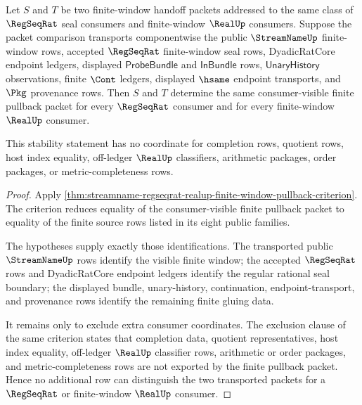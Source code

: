 \begin{theorem}
\label{thm:streamname-regseqrat-realup-pullback-stability}
Let $S$ and $T$ be two finite-window handoff packets addressed to the same
class of $\RegSeqRat$ seal consumers and finite-window $\RealUp$ consumers.
Suppose the packet comparison transports componentwise the public
$\StreamNameUp$ finite-window rows, accepted $\RegSeqRat$ finite-window seal
rows, DyadicRatCore endpoint ledgers, displayed $\mathsf{ProbeBundle}$ and
$\mathsf{InBundle}$ rows, $\mathsf{UnaryHistory}$ observations, finite
$\Cont$ ledgers, displayed $\hsame$ endpoint transports, and $\Pkg$ provenance
rows. Then $S$ and $T$ determine the same consumer-visible finite pullback
packet for every $\RegSeqRat$ consumer and for every finite-window $\RealUp$
consumer.

This stability statement has no coordinate for completion rows, quotient
rows, host index equality, off-ledger $\RealUp$ classifiers,
arithmetic packages, order packages, or metric-completeness rows.
\end{theorem}
\begin{proof}
Apply
\autoref{thm:streamname-regseqrat-realup-finite-window-pullback-criterion}.
The criterion reduces equality of the consumer-visible finite pullback packet
to equality of the finite source rows listed in its eight public families.

The hypotheses supply exactly those identifications. The transported public
$\StreamNameUp$ rows identify the visible finite window; the accepted
$\RegSeqRat$ rows and DyadicRatCore endpoint ledgers identify the regular
rational seal boundary; the displayed bundle, unary-history, continuation,
endpoint-transport, and provenance rows identify the remaining finite
gluing data.

It remains only to exclude extra consumer coordinates. The exclusion clause
of the same criterion states that completion data, quotient representatives,
host index equality, off-ledger $\RealUp$ classifier rows, arithmetic or order
packages, and metric-completeness rows are not exported by the finite pullback
packet. Hence no additional row can distinguish the two transported packets
for a $\RegSeqRat$ or finite-window $\RealUp$ consumer.
\end{proof}
